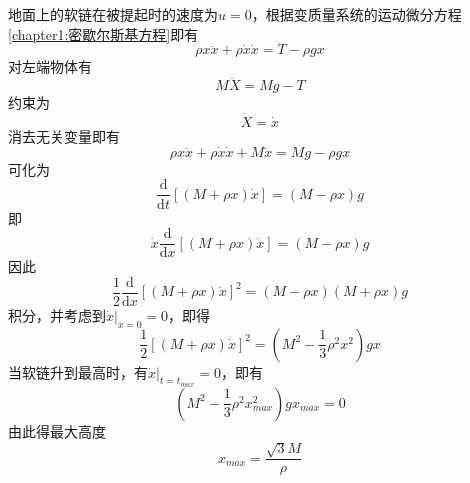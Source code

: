 \begin{solution}
地面上的软链在被提起时的速度为$u =0$，根据变质量系统的运动微分方程\eqref{chapter1:密歇尔斯基方程}即有
\begin{equation*}
	\rho x \ddot{x} + \rho \dot{x} \dot{x} = T - \rho gx
\end{equation*}
对左端物体有
\begin{equation*}
	M\ddot{X} = Mg - T
\end{equation*}
约束为
\begin{equation*}
	\dot{X} = \dot{x}
\end{equation*}
消去无关变量即有
\begin{equation*}
	\rho x \ddot{x} + \rho \dot{x} \dot{x} + M\ddot{x} = Mg - \rho g x
\end{equation*}
可化为
\begin{equation*}
	\frac{\mathrm{d}}{\mathrm{d} t} [(M+\rho x) \dot{x}] = (M-\rho x) g
\end{equation*}
即
\begin{equation*}
	\dot{x} \frac{\mathrm{d}}{\mathrm{d} x} [(M+\rho x) \dot{x}] = (M-\rho x) g
\end{equation*}
因此
\begin{equation*}
	\frac12 \frac{\mathrm{d}}{\mathrm{d} x} [(M+\rho x) \dot{x}]^2 = (M-\rho x)(M+\rho x) g
\end{equation*}
积分，并考虑到$\dot{x}\big|_{x=0} = 0$，即得
\begin{equation*}
	\frac12 \left[(M+\rho x)\dot{x}\right]^2 = \left(M^2 - \frac13 \rho^2 x^2\right) gx
\end{equation*}
当软链升到最高时，有$\dot{x}\big|_{t=t_{max}} = 0$，即有
\begin{equation*}
	\left(M^2 - \frac13 \rho^2 x^2_{max}\right) gx_{max} = 0
\end{equation*}
由此得最大高度
\begin{equation*}
	x_{max} = \frac{\sqrt{3}M}{\rho}
\end{equation*}
\end{solution}